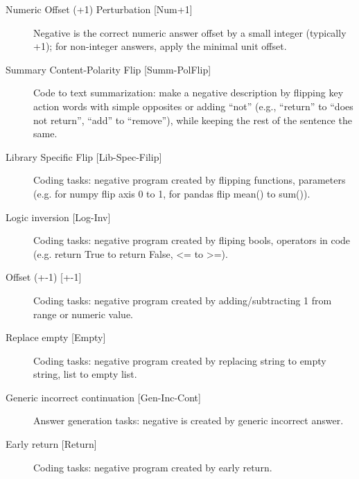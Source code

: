 \documentclass{article}
\begin{document}
\begin{description}
  \item[Numeric Offset (+1) Perturbation \textnormal{[Num+1]}] Negative is the correct numeric answer offset by a small integer (typically +1); for non-integer answers, apply the minimal unit offset.
  \item[Summary Content-Polarity Flip \textnormal{[Summ-PolFlip]}] Code to text summarization: make a negative description by flipping key action words with simple opposites or adding “not” (e.g., “return” to “does not return”, “add” to “remove”), while keeping the rest of the sentence the same.
  \item [Library Specific Flip \textnormal{[Lib-Spec-Filip]}] Coding tasks: negative program created by flipping functions, parameters (e.g. for numpy flip axis 0 to 1, for pandas flip mean() to sum()).
  \item [Logic inversion \textnormal{[Log-Inv]}] Coding tasks: negative program created by fliping bools, operators in code (e.g. return True to return False, <= to >=).
  \item [Offset (+-1) \textnormal{[+-1]}] Coding tasks: negative program created by adding/subtracting 1 from range or numeric value.
  \item [Replace empty \textnormal{[Empty]}] Coding tasks: negative program created by replacing string to empty string, list to empty list.
  \item [Generic incorrect continuation \textnormal{[Gen-Inc-Cont]}] Answer generation tasks: negative is created by generic incorrect answer.
  \item [Early return \textnormal{[Return]}] Coding tasks: negative program created by early return.
\end{description}
\end{document}
